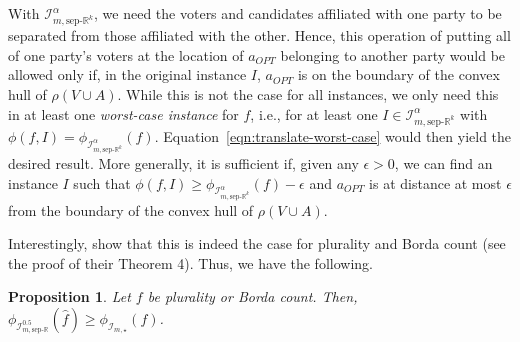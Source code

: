 \documentclass[letterpaper]{article} %
\newcommand{\citet}[1]{\citeauthor{#1}~\shortcite{#1}}
\newtheorem{theorem}{Theorem}
\newtheorem{proposition}[theorem]{Proposition}
\theoremstyle{definition}
\newtheorem{definition}{Definition}
\renewcommand{\hat}{\widehat}
\DeclareMathOperator*{\argmin}{\arg\,\min}
\newcommand{\bbR}{\mathbb{R}}
\newcommand{\calI}{\mathcal{I}}
\newcommand{\all}{\star}
\newcommand{\sep}{\textrm{sep-}}
\newcommand{\euc}[1]{\bbR^{#1}}
\newcommand{\eucsep}[1]{\sep\euc{#1}}
\newcommand{\eucline}{\bbR}
\newcommand{\euclinesep}{\sep\eucline}
\newcommand{\I}{\calI}
\begin{document}
With $\I^{\alpha}_{m,\eucsep{k}}$, we need the voters and candidates affiliated with one party to be separated from those affiliated with the other. Hence, this operation of putting all of one party's voters at the location of $a_{OPT}$ belonging to another party would be allowed only if, in the original instance $I$, $a_{OPT}$ is on the boundary of the convex hull of $\rho(V \cup A)$. While this is not the case for all instances, we only need this in at least one \emph{worst-case instance} for $f$, i.e., for at least one $I \in \I^{\alpha}_{m,\eucsep{k}}$ with $\phi(f,I) = \phi_{\I^{\alpha}_{m,\eucsep{k}}}(f)$. Equation~\eqref{eqn:translate-worst-case} would then yield the desired result. More generally, it is sufficient if, given any $\epsilon > 0$, we can find an instance $I$ such that $\phi(f,I) \ge \phi_{\I^{\alpha}_{m,\eucsep{k}}}(f) - \epsilon$ and $a_{OPT}$ is at distance at most $\epsilon$ from the boundary of the convex hull of $\rho(V \cup A)$. 


Interestingly, \cite{ABP15} show that this is indeed the case for plurality and Borda count (see the proof of their Theorem 4). Thus, we have the following.

\begin{proposition}
	Let $f$ be plurality or Borda count. Then, $\phi_{\I^{0.5}_{m,\euclinesep}}(\hat{f}) \ge \phi_{\I_{m,\all}}(f)$.
\label{prop:plu-borda}
\end{proposition}

%
%
%
%
%
\end{document}
